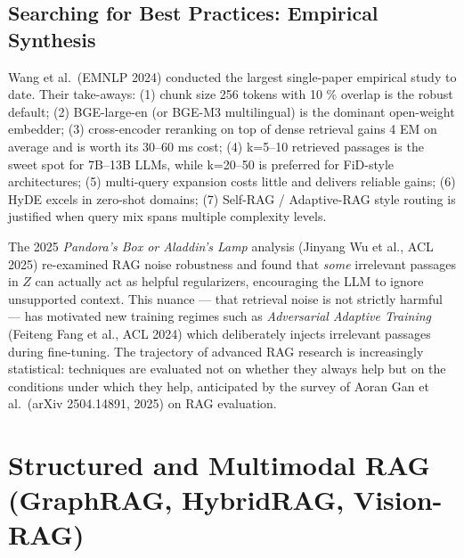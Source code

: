 \subsection{Searching for Best Practices: Empirical Synthesis}\label{searching-for-best-practices-empirical-synthesis}

Wang et al.~(EMNLP 2024) conducted the largest single-paper empirical study to date. Their take-aways: (1) chunk size 256 tokens with 10 \% overlap is the robust default; (2) BGE-large-en (or BGE-M3 multilingual) is the dominant open-weight embedder; (3) cross-encoder reranking on top of dense retrieval gains 4 EM on average and is worth its 30--60 ms cost; (4) k=5--10 retrieved passages is the sweet spot for 7B--13B LLMs, while k=20--50 is preferred for FiD-style architectures; (5) multi-query expansion costs little and delivers reliable gains; (6) HyDE excels in zero-shot domains; (7) Self-RAG / Adaptive-RAG style routing is justified when query mix spans multiple complexity levels.

The 2025 \emph{Pandora's Box or Aladdin's Lamp} analysis (Jinyang Wu et al., ACL 2025) re-examined RAG noise robustness and found that \emph{some} irrelevant passages in \(Z\) can actually act as helpful regularizers, encouraging the LLM to ignore unsupported context. This nuance --- that retrieval noise is not strictly harmful --- has motivated new training regimes such as \emph{Adversarial Adaptive Training} (Feiteng Fang et al., ACL 2024) which deliberately injects irrelevant passages during fine-tuning. The trajectory of advanced RAG research is increasingly statistical: techniques are evaluated not on whether they always help but on the conditions under which they help, anticipated by the survey of Aoran Gan et al.~(arXiv 2504.14891, 2025) on RAG evaluation.

\section{Structured and Multimodal RAG (GraphRAG, HybridRAG, Vision-RAG)}\label{structured-and-multimodal-rag-graphrag-hybridrag-vision-rag}


